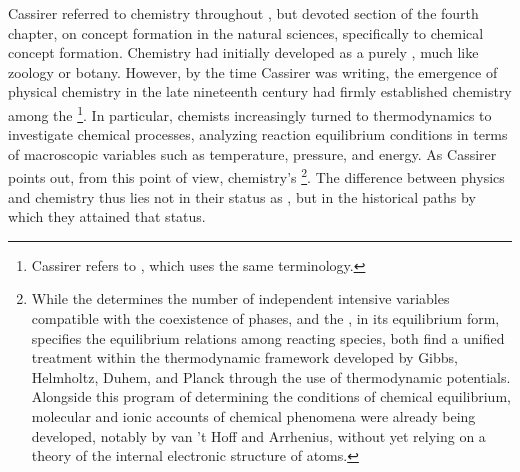 \documentclass[submitted,12pt]{article}
\begin{document}
Cassirer referred to chemistry throughout \SFt, but devoted section  of the fourth chapter, on concept formation  in the natural sciences, specifically to chemical concept formation. Chemistry had initially developed as a purely , much like zoology or botany. However, by the time Cassirer was writing, the emergence of physical chemistry in the late nineteenth century had firmly established chemistry among the \footnote{Cassirer refers to \citet{Nernst1896}, which uses the same terminology.}. In particular, chemists increasingly turned to thermodynamics to investigate chemical processes, analyzing reaction equilibrium conditions in terms of macroscopic variables such as temperature, pressure, and energy. As Cassirer points out, from this point of view, chemistry's  \footnote{While the  determines the number of independent intensive variables compatible with the coexistence of phases, and the , in its equilibrium form, specifies the equilibrium relations among reacting species, both find a unified treatment within the thermodynamic framework developed by Gibbs, Helmholtz, Duhem, and Planck through the use of thermodynamic potentials. Alongside this program of determining the conditions of chemical equilibrium, molecular and ionic accounts of chemical phenomena were already being developed, notably by van 't Hoff and Arrhenius, without yet relying on a theory of the internal electronic structure of atoms.}. The difference between physics and chemistry thus lies not in their status as , but in the historical paths by which they attained that status. 
\end{document}
